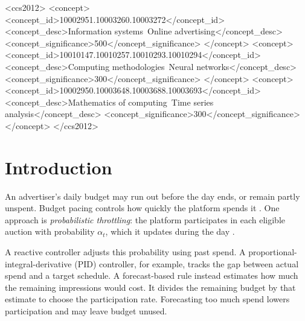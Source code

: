 \documentclass[sigconf,nonacm]{acmart}
\begin{document}
\begin{CCSXML}
<ccs2012>
   <concept>
       <concept_id>10002951.10003260.10003272</concept_id>
       <concept_desc>Information systems~Online advertising</concept_desc>
       <concept_significance>500</concept_significance>
   </concept>
   <concept>
       <concept_id>10010147.10010257.10010293.10010294</concept_id>
       <concept_desc>Computing methodologies~Neural networks</concept_desc>
       <concept_significance>300</concept_significance>
   </concept>
   <concept>
       <concept_id>10002950.10003648.10003688.10003693</concept_id>
       <concept_desc>Mathematics of computing~Time series analysis</concept_desc>
       <concept_significance>300</concept_significance>
   </concept>
</ccs2012>
\end{CCSXML}



\maketitle

\section{Introduction}

An advertiser's daily budget may run out before the day ends, or remain partly
unspent. Budget pacing controls how quickly the platform spends it
\cite{lee2013real,agarwal2014budget}. One approach is \emph{probabilistic
throttling}: the platform participates in each eligible auction with probability
$\alpha_t$, which it updates during the day
\cite{agarwal2014budget,xu2015smart,balseiro2017budget}.

A reactive controller adjusts this probability using past spend. A
proportional-integral-derivative (PID) controller, for example, tracks the gap
between actual spend and a target schedule. A forecast-based rule instead
estimates how much the remaining impressions would cost. It divides the
remaining budget by that estimate to choose the participation rate. Forecasting
too much spend lowers participation and may leave budget unused.
\end{document}
